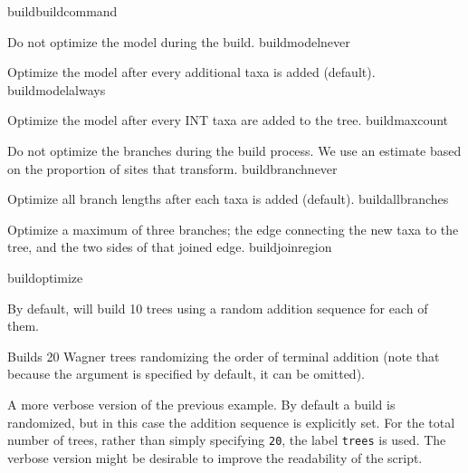 \begin{command}{build}{buildcommand}
\begin{arguments}
{            \begin{description}

                    {Do not optimize the model during the build.}
                    {buildmodelnever}

                    {Optimize the model after every additional taxa is added (default).}
                    {buildmodelalways}

                    {Optimize the model after every INT taxa are added to the tree.}
                    {buildmaxcount}
                    
                    {Do not optimize the branches during the build process. We use
                    an estimate based on the proportion of sites that transform.}
                    {buildbranchnever}

                    {Optimize all branch lengths after each taxa is added (default).}
                    {buildallbranches}

                    {Optimize a maximum of three branches; the edge connecting
                    the new taxa to the tree, and the two sides of that joined
                    edge.}
                    {buildjoinregion}

            \end{description}
            }
            {buildoptimize}

   \end{arguments}
      
       {By default, \poy will build 10 trees using a random addition sequence for
       each of them.}

	\begin{poyexamples}
            {Builds 20 Wagner trees randomizing the order of terminal
            addition (note that because the argument  
            is specified by default, it can be omitted).}

            {A more verbose version of the previous example. By default a build
            is randomized, but in this case the addition sequence is explicitly
            set. For the total number of trees, rather than simply specifying \texttt{20},
            the label \texttt{trees} is used. The verbose version might be desirable
            to improve the readability of the script.}


\end{poyexamples}
\end{command}
